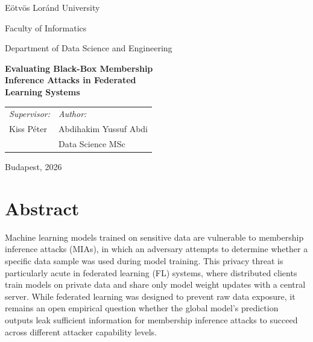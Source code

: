 \documentclass[12pt, a4paper]{report}
\begin{document}
\begin{titlepage}
  \centering
  \vspace*{1cm}
  {\large Eötvös Loránd University\par}
  \vspace{0.2cm}
  {\large Faculty of Informatics\par}
  \vspace{0.2cm}
  {\normalsize Department of Data Science and Engineering\par}
  \vspace{3.5cm}
  {\fontsize{22pt}{28pt}\selectfont\bfseries
    Evaluating Black-Box Membership\\[8pt]
    Inference Attacks in Federated\\[8pt]
    Learning Systems\par}
  \vspace{4cm}
  \begin{tabular}{p{6cm} p{6cm}}
    \textit{Supervisor:}  & \textit{Author:} \\[6pt]
    Kiss Péter            & Abdihakim Yussuf Abdi \\
                          & Data Science MSc \\
  \end{tabular}
  \vfill
  {\normalsize Budapest, 2026\par}
\end{titlepage}

\chapter*{Abstract}

Machine learning models trained on sensitive data are vulnerable to membership
inference attacks (MIAs), in which an adversary attempts to determine whether a
specific data sample was used during model training. This privacy threat is
particularly acute in federated learning (FL) systems, where distributed clients
train models on private data and share only model weight updates with a central
server. While federated learning was designed to prevent raw data exposure, it
remains an open empirical question whether the global model's prediction outputs
leak sufficient information for membership inference attacks to succeed across
different attacker capability levels.
\end{document}
